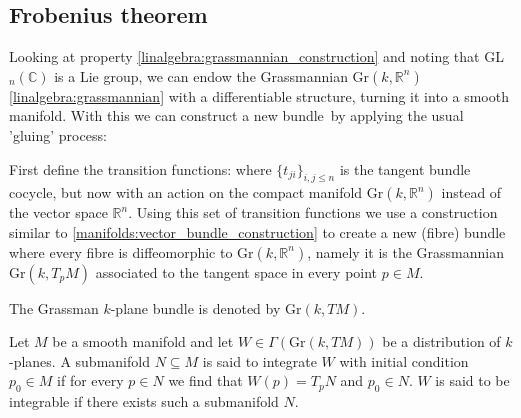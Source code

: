 \subsection{Frobenius theorem}

	Looking at property \ref{linalgebra:grassmannian_construction} and noting that GL$_n(\mathbb{C})$ is a Lie group, we can endow the Grassmannian Gr$(k, \mathbb{R}^n)$ \ref{linalgebra:grassmannian} with a differentiable structure, turning it into a smooth manifold. With this we can construct a new bundle\footnotemark\ by applying the usual 'gluing' process:
	
	\begin{construct}
		First define the transition functions:
		where $\{t_{ji}\}_{i, j\leq n}$ is the tangent bundle cocycle, but now with an action on the compact manifold Gr$(k, \mathbb{R}^n)$ instead of the vector space $\mathbb{R}^n$. Using this set of transition functions we use a construction similar to \ref{manifolds:vector_bundle_construction} to create a new (fibre) bundle where every fibre is diffeomorphic to Gr$(k, \mathbb{R}^n)$, namely it is the Grassmannian Gr$(k, T_pM)$ associated to the tangent space in every point $p\in M$.
	\end{construct}
	\begin{notation}
		The Grassman $k$-plane bundle is denoted by Gr$(k, TM)$.
	\end{notation}
	
	
	\begin{definition}[Integrable]
		Let $M$ be a smooth manifold and let $W\in\Gamma(\text{Gr}(k, TM))$ be a distribution of $k$-planes. A submanifold $N\subseteq M$ is said to integrate $W$ with initial condition $p_0\in M$ if for every $p\in N$ we find that $W(p) = T_pN$ and $p_0\in N$. $W$ is said to be integrable if there exists such a submanifold $N$.
	\end{definition}
	
